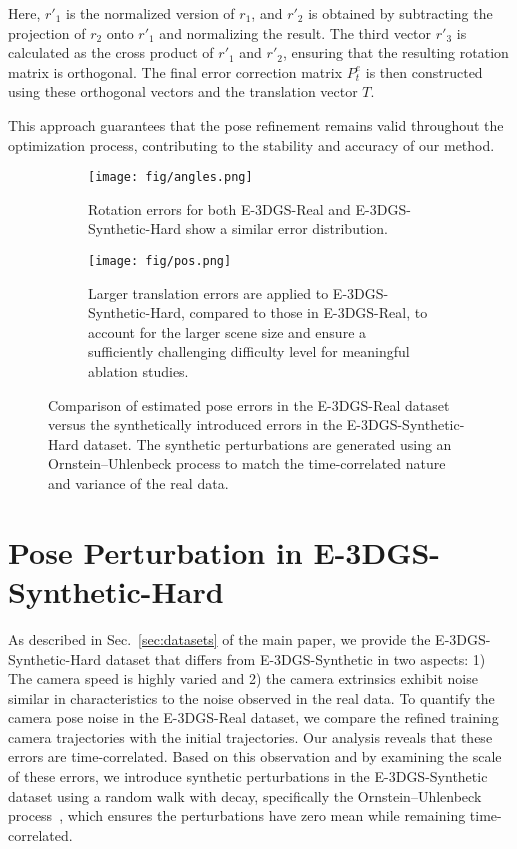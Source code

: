 Here, $r'_1$ is the normalized version of $r_1$, and $r'_2$ is obtained by subtracting the projection of $r_2$ onto $r'_1$ and normalizing the result. The third vector $r'_3$ is calculated as the cross product of $r'_1$ and $r'_2$, ensuring that the resulting rotation matrix is orthogonal. The final error correction matrix $P^e_t$ is then constructed using these orthogonal vectors and the translation vector $T$.

This approach guarantees that the pose refinement remains valid throughout the optimization process, contributing to the stability and accuracy of our method.


\begin{figure*}[!ht]
\centering
\begin{subfigure}[b]{0.8\linewidth}
    \centering
    \texttt{[image: fig/angles.png]}
    \caption{Rotation errors for both E-3DGS-Real and E-3DGS-Synthetic-Hard show a similar error distribution.}
\end{subfigure}
\hfill
\begin{subfigure}[b]{0.8\linewidth}
    \centering
    \texttt{[image: fig/pos.png]}
    \caption{Larger translation errors are applied to E-3DGS-Synthetic-Hard, compared to those in E-3DGS-Real, to account for the larger scene size and ensure a sufficiently challenging difficulty level for meaningful ablation studies.}
\end{subfigure}
\caption{Comparison of estimated pose errors in the E-3DGS-Real dataset versus the synthetically introduced errors in the E-3DGS-Synthetic-Hard dataset. The synthetic perturbations are generated using an Ornstein–Uhlenbeck process to match the time-correlated nature and variance of the real data.}
\label{fig:noise}
\end{figure*}


\section{Pose Perturbation in E-3DGS-Synthetic-Hard}
\label{sec:supp_dataset_perturb}

As described in Sec.~\ref{sec:datasets} of the main paper, we provide the E-3DGS-Synthetic-Hard dataset that differs from E-3DGS-Synthetic in two aspects: 1) The camera speed is highly varied and 2) the camera extrinsics exhibit noise similar in characteristics to the noise observed in the real data. 
To quantify the camera pose noise in the E-3DGS-Real dataset, we compare the refined training camera trajectories with the initial trajectories. Our analysis reveals that these errors are time-correlated. Based on this observation and by examining the scale of these errors, we introduce synthetic perturbations in the E-3DGS-Synthetic dataset using a random walk with decay, specifically the Ornstein–Uhlenbeck process~\cite{pavliotis2014stochastic}, which ensures the perturbations have zero mean while remaining time-correlated. 

